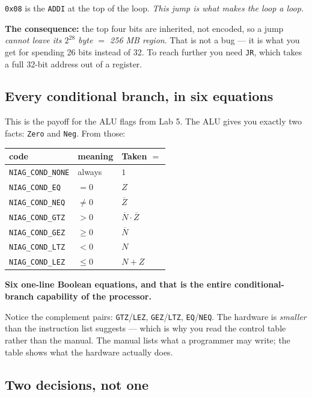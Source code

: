 \documentclass[11pt]{article}
\newcommand{\code}[1]{\texttt{#1}}
\begin{document}
\code{0x08} is the \code{ADDI} at the top of the loop. \emph{This jump is what
makes the loop a loop.}

\textbf{The consequence:} the top four bits are inherited, not encoded, so a
jump \emph{cannot leave its $2^{28}$ byte $=$ 256 MB region}. That is not a bug
--- it is what you get for spending 26 bits instead of 32. To reach further you
need \code{JR}, which takes a full 32-bit address out of a register.

\subsection*{Every conditional branch, in six equations}

This is the payoff for the ALU flags from Lab 5. The ALU gives you exactly two
facts: \code{Zero} and \code{Neg}. From those:

\begin{center}
\begin{tabular}{lll}
\toprule
code & meaning & Taken $=$ \\
\midrule
\code{NIAG\_COND\_NONE} & always & $1$ \\
\code{NIAG\_COND\_EQ}   & $= 0$ & $Z$ \\
\code{NIAG\_COND\_NEQ}  & $\neq 0$ & $\overline{Z}$ \\
\code{NIAG\_COND\_GTZ}  & $> 0$ & $\overline{N}\cdot\overline{Z}$ \\
\code{NIAG\_COND\_GEZ}  & $\geq 0$ & $\overline{N}$ \\
\code{NIAG\_COND\_LTZ}  & $< 0$ & $N$ \\
\code{NIAG\_COND\_LEZ}  & $\leq 0$ & $N + Z$ \\
\bottomrule
\end{tabular}
\end{center}

\textbf{Six one-line Boolean equations, and that is the entire conditional-branch
capability of the processor.}

Notice the complement pairs: \code{GTZ}/\code{LEZ}, \code{GEZ}/\code{LTZ},
\code{EQ}/\code{NEQ}. The hardware is \emph{smaller} than the instruction list
suggests --- which is why you read the control table rather than the manual. The
manual lists what a programmer may write; the table shows what the hardware
actually does.

\subsection*{Two decisions, not one}
\end{document}
